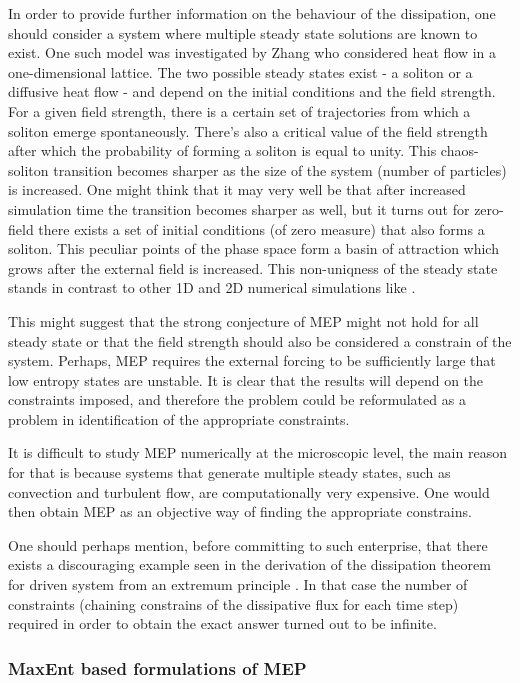\documentclass[a4paper,12pt]{article}
\begin{document}
In order to provide further information on the behaviour of the dissipation, one should consider a system where multiple steady state solutions are known to exist. One such model was investigated by Zhang\cite{Zhang:2001jc} who considered heat flow in a one-dimensional lattice. The two possible steady states exist - a soliton or a diffusive heat flow - and depend on the initial conditions and the field strength.
For a given field strength, there is a certain set of trajectories from which a soliton emerge spontaneously. There's also a critical value of the field strength after which the probability of forming a soliton is equal to unity. This chaos-soliton transition becomes sharper as the size of the system (number of particles) is increased. One might think that it may very well be that after increased simulation time the transition becomes sharper as well, but it turns out for zero-field there exists a set of initial conditions (of zero measure) that also forms a soliton. This peculiar points of the phase space form a basin of attraction which grows after the external field is increased. This non-uniqness of the steady state stands in contrast to other 1D and 2D  numerical simulations like \cite{Maeda:1995bj}.

This might suggest that the strong conjecture of MEP might not hold for all steady state or that the field strength should also be considered a constrain of the system.
Perhaps, MEP requires the external forcing to be sufficiently large that low entropy states are unstable. It is clear that the results will depend on the constraints imposed, and therefore the problem could be reformulated as a problem in identification of the appropriate constraints.

It is difficult to study MEP numerically at the microscopic level, the main reason for that is because systems that generate multiple steady states, such as convection and turbulent flow, are computationally very expensive. One would then obtain MEP as an objective way of finding the appropriate constrains.

One should perhaps mention, before committing to such enterprise, that there exists a discouraging example seen in the derivation of the dissipation theorem for driven system from an extremum principle \cite{Evans:1985br}. In that case the number of constraints (chaining constrains of the dissipative flux for each time step) required in order to obtain the exact answer turned out to be infinite. 

\subsubsection{MaxEnt based formulations of MEP}
\end{document}
